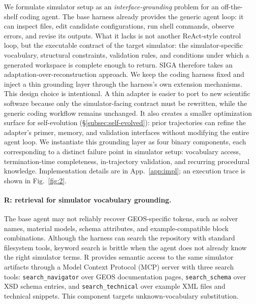 \documentclass{article}
\begin{document}
We formulate simulator setup as an \emph{interface-grounding} problem for an off-the-shelf coding agent. 
The base harness already provides the generic agent loop: it can inspect files, edit candidate configurations, run shell commands, observe errors, and revise its outputs. 
What it lacks is not another ReAct-style control loop, but the executable contract of the target simulator: the simulator-specific vocabulary, structural constraints, validation rules, and conditions under which a generated workspace is complete enough to return. 
SIGA therefore takes an adaptation-over-reconstruction approach. 
We keep the coding harness fixed and inject a thin grounding layer through the harness's own extension mechanisms.
This design choice is intentional. 
A thin adapter is easier to port to new scientific software because only the simulator-facing contract must be rewritten, while the generic coding workflow remains unchanged. 
It also creates a smaller optimization surface for self-evolution (\S\ref{subsec:self-evolved}): prior trajectories can refine the adapter's primer, memory, and validation interfaces without modifying the entire agent loop. 
We instantiate this grounding layer as four binary components, each corresponding to a distinct failure point in simulator setup: vocabulary access, termination-time completeness, in-trajectory validation, and recurring procedural knowledge. 
Implementation details are in App.~\ref{app:impl}; an execution trace is shown in Fig.~\ref{fig:2}.

\paragraph{R: retrieval for simulator vocabulary grounding.}
The base agent may not reliably recover GEOS-specific tokens, such as solver names, material models, schema attributes, and example-compatible block combinations. 
Although the harness can search the repository with standard filesystem tools, keyword search is brittle when the agent does not already know the right simulator terms. 
R provides semantic access to the same simulator artifacts through a Model Context Protocol (MCP) server with three search tools: \texttt{search\_navigator} over GEOS documentation pages, \texttt{search\_schema} over XSD schema entries, and \texttt{search\_technical} over example XML files and technical snippets. 
This component targets unknown-vocabulary substitution.
\end{document}
